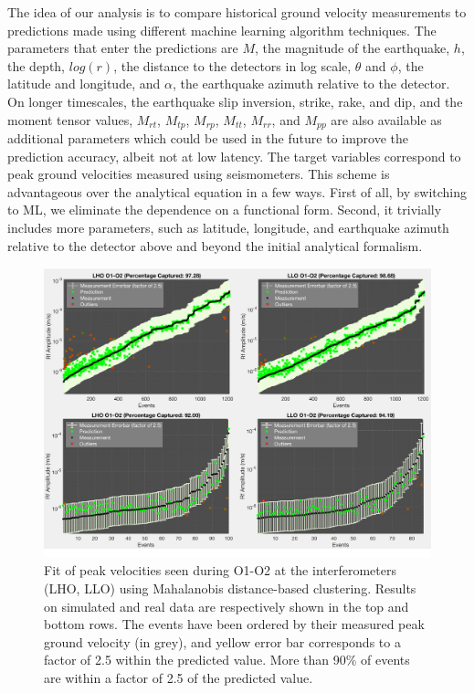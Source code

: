 \documentclass[twocolumn, aps, superscriptaddress]{revtex4}
\begin{document}
The idea of our analysis is to compare historical ground velocity measurements to predictions made using different machine learning algorithm techniques. The parameters that enter the predictions are $M$, the magnitude of the earthquake, $h$, the depth, $log(r)$, the distance to the detectors in log scale, $\theta$ and $\phi$, the latitude and longitude, and $\alpha$, the earthquake azimuth relative to the detector. On longer timescales, the earthquake slip inversion, strike, rake, and dip, and the moment tensor values, $M_{rt}$, $M_{tp}$, $M_{rp}$, $M_{tt}$, $M_{rr}$, and $M_{pp}$ are also available as additional parameters which could be used in the future to improve the prediction accuracy, albeit not at low latency. The target variables correspond to peak ground velocities measured using seismometers. This scheme is advantageous over the analytical equation in a few ways. First of all, by switching to ML, we eliminate the dependence on a functional form.
Second, it trivially includes more parameters, such as latitude, longitude, and earthquake azimuth relative to the detector above and beyond the initial analytical formalism. 



\begin{figure}[!htb]
\hspace*{-0.5cm}
 \includegraphics[width=\textwidth]{./plots/ClusteringPrediction.pdf}
 \caption{Fit of peak velocities seen during O1-O2 at the interferometers (LHO, LLO) using Mahalanobis distance-based clustering. Results on simulated and real data are respectively shown in the top and bottom rows. The events have been ordered by their measured peak ground velocity (in grey), and yellow error bar corresponds to a factor of 2.5 within the predicted value. More than 90\% of events are within a factor of 2.5 of the predicted value.}
 \label{fig:regression_LIGO}
\end{figure}
\end{document}
